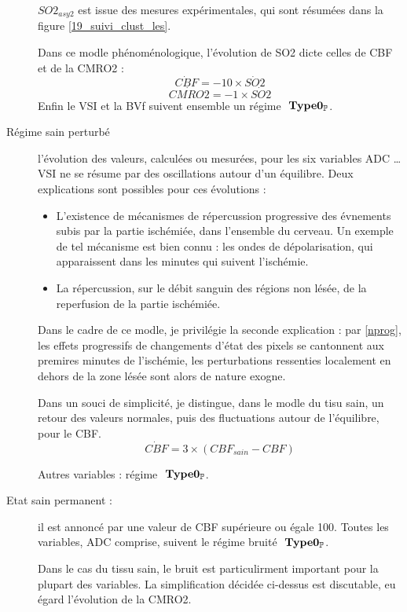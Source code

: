 \begin{description}
$SO2_{asy2}$ est issue des mesures exp\'erimentales, qui sont r\'esum\'ees dans la figure \ref{19_suivi_clust_les}.
\par
Dans ce modle ph\'enom\'enologique, l'\'evolution de SO2 dicte celles de CBF et de la CMRO2 :
\begin{equation}
\dot{CBF}=-10\times\dot{SO2}
\end{equation}
\begin{equation}
\dot{CMRO2}=-1\times\dot{SO2}
\end{equation}
Enfin le VSI et la BVf suivent ensemble un r\'egime $\ \mathbf{Type 0_{\mathbb{P}}}$.
%
\item[R\'egime sain perturb\'e] l'\'evolution des valeurs, calcul\'ees ou mesur\'ees, pour les six variables ADC \dots VSI %
ne se r\'esume par  des oscillations autour d'un \'equilibre. Deux explications sont possibles pour ces \'evolutions :
\begin{itemize}
\item L'existence de m\'ecanismes de r\'epercussion progressive des \'evnements subis par la partie isch\'emi\'ee, %
dans l'ensemble du cerveau. Un exemple de tel m\'ecanisme est bien connu : les ondes de d\'epolarisation, qui apparaissent dans les minutes qui suivent l'isch\'emie.
%
\item La r\'epercussion, sur le d\'ebit sanguin des r\'egions non l\'es\'ee, de la reperfusion de la partie isch\'emi\'ee.
\end{itemize}

\par
Dans le cadre de ce modle, je privil\'egie la seconde explication : par \ref{nprog}, %
les effets progressifs de changements d'\'etat des pixels se cantonnent aux premires minutes de l'isch\'emie, %
les perturbations ressenties localement en dehors de la zone l\'es\'ee sont alors de nature exogne.

\par
Dans un souci de simplicit\'e, je distingue, dans le modle du tisu sain, %
un retour  des valeurs normales, puis des fluctuations autour de l'\'equilibre, pour le CBF.
\begin{equation}
\dot{CBF}=3\times (CBF_{sain}-CBF)
\end{equation}

Autres variables : r\'egime $\ \mathbf{Type 0_{\mathbb{P}}}$.
\item[Etat sain permanent : ] il est annonc\'e par une valeur de CBF sup\'erieure ou \'egale  100. %
Toutes les variables, ADC comprise, suivent le r\'egime bruit\'e $\ \mathbf{Type 0_{\mathbb{P}}}$.

\par
Dans le cas du tissu sain, le bruit est particulirment important pour la plupart des variables. %
La simplification d\'ecid\'ee ci-dessus est discutable, eu \'egard l'\'evolution de la CMRO2.
\end{description}

